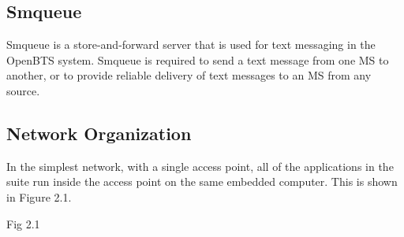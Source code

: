 \subsection{Smqueue}
Smqueue is a store-and-forward server that is used for text messaging in the OpenBTS system. Smqueue is required to send a text message from one MS to another, or to provide reliable delivery of text messages to an MS from any source.

\subsection{Network Organization}
In the simplest network, with a single access point, all of the applications in the suite run inside the access point on the same embedded computer. This is shown in Figure 2.1.


Fig 2.1





















